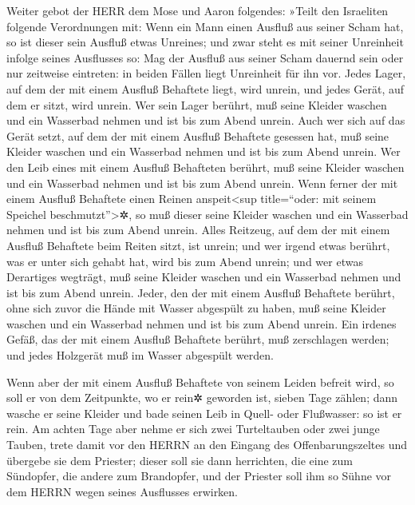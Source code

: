 Weiter gebot der HERR dem Mose und Aaron folgendes:
»Teilt den Israeliten folgende Verordnungen mit: Wenn ein
Mann einen Ausfluß aus seiner Scham hat, so ist dieser sein Ausfluß
etwas Unreines; und zwar steht es mit seiner Unreinheit
infolge seines Ausflusses so: Mag der Ausfluß aus seiner Scham dauernd
sein oder nur zeitweise eintreten: in beiden Fällen liegt Unreinheit für
ihn vor. Jedes Lager, auf dem der mit einem Ausfluß
Behaftete liegt, wird unrein, und jedes Gerät, auf dem er sitzt, wird
unrein. Wer sein Lager berührt, muß seine Kleider waschen
und ein Wasserbad nehmen und ist bis zum Abend unrein.
Auch wer sich auf das Gerät setzt, auf dem der mit einem
Ausfluß Behaftete gesessen hat, muß seine Kleider waschen und ein
Wasserbad nehmen und ist bis zum Abend unrein. Wer den
Leib eines mit einem Ausfluß Behafteten berührt, muß seine Kleider
waschen und ein Wasserbad nehmen und ist bis zum Abend unrein.
Wenn ferner der mit einem Ausfluß Behaftete einen Reinen
anspeit\textless sup title=``oder: mit seinem Speichel
beschmutzt''\textgreater✲, so muß dieser seine Kleider waschen und ein
Wasserbad nehmen und ist bis zum Abend unrein. Alles
Reitzeug, auf dem der mit einem Ausfluß Behaftete beim Reiten sitzt, ist
unrein; und wer irgend etwas berührt, was er unter sich
gehabt hat, wird bis zum Abend unrein; und wer etwas Derartiges
wegträgt, muß seine Kleider waschen und ein Wasserbad nehmen und ist bis
zum Abend unrein. Jeder, den der mit einem Ausfluß
Behaftete berührt, ohne sich zuvor die Hände mit Wasser abgespült zu
haben, muß seine Kleider waschen und ein Wasserbad nehmen und ist bis
zum Abend unrein. Ein irdenes Gefäß, das der mit einem
Ausfluß Behaftete berührt, muß zerschlagen werden; und jedes Holzgerät
muß im Wasser abgespült werden.

Wenn aber der mit einem Ausfluß Behaftete von seinem
Leiden befreit wird, so soll er von dem Zeitpunkte, wo er rein✲ geworden
ist, sieben Tage zählen; dann wasche er seine Kleider und bade seinen
Leib in Quell- oder Flußwasser: so ist er rein. Am achten
Tage aber nehme er sich zwei Turteltauben oder zwei junge Tauben, trete
damit vor den HERRN an den Eingang des Offenbarungszeltes und übergebe
sie dem Priester; dieser soll sie dann herrichten, die
eine zum Sündopfer, die andere zum Brandopfer, und der Priester soll ihm
so Sühne vor dem HERRN wegen seines Ausflusses erwirken.

